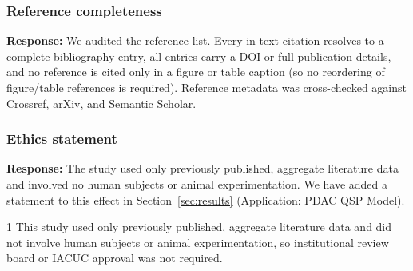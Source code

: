 \documentclass[11pt]{article}
\newcommand{\response}[1]{\textcolor{responsecolor}{\textbf{Response:} #1}}
\providecommand{\trackchanges}{1}
\newenvironment{revised}{\if1\trackchanges\color{blue}\fi}{}
\begin{document}
\subsubsection*{Reference completeness}
\response{We audited the reference list. Every in-text citation resolves to a complete bibliography entry, all entries carry a DOI or full publication details, and no reference is cited only in a figure or table caption (so no reordering of figure/table references is required). Reference metadata was cross-checked against Crossref, arXiv, and Semantic Scholar.}

\subsubsection*{Ethics statement}
\response{The study used only previously published, aggregate literature data and involved no human subjects or animal experimentation. We have added a statement to this effect in Section~\ref{sec:results} (Application: PDAC QSP Model).}

\begin{revised}
This study used only previously published, aggregate literature data and did not involve human subjects or animal experimentation, so institutional review board or IACUC approval was not required.
\end{revised}



\end{document}

